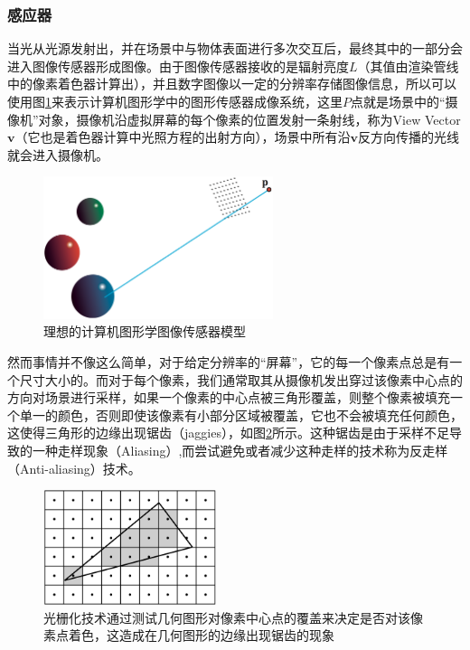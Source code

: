 \subsubsection{感应器}\label{sec:intro-sensor}
当光从光源发射出，并在场景中与物体表面进行多次交互后，最终其中的一部分会进入图像传感器形成图像。由于图像传感器接收的是辐射亮度$L$（其值由渲染管线中的像素着色器计算出），并且数字图像以一定的分辨率存储图像信息，所以可以使用图\ref{f:intro-camera}来表示计算机图形学中的图形传感器成像系统，这里$P$点就是场景中的“摄像机”对象，摄像机沿虚拟屏幕的每个像素的位置发射一条射线，称为View Vector $\mathbf{v}$（它也是着色器计算中光照方程的出射方向），场景中所有沿$\mathbf{v}$反方向传播的光线就会进入摄像机。

\begin{figure}
\sidecaption
	\includegraphics[width=0.6\textwidth]{figures/intro/camera}
	\caption{理想的计算机图形学图像传感器模型}
	\label{f:intro-camera}
\end{figure}

然而事情并不像这么简单，对于给定分辨率的“屏幕”，它的每一个像素点总是有一个尺寸大小的。而对于每个像素，我们通常取其从摄像机发出穿过该像素中心点的方向对场景进行采样，如果一个像素的中心点被三角形覆盖，则整个像素被填充一个单一的颜色，否则即使该像素有小部分区域被覆盖，它也不会被填充任何颜色，这使得三角形的边缘出现锯齿（jaggies），如图\ref{f:intro-aliasing-triangle}所示。这种锯齿是由于采样不足导致的一种走样现象（Aliasing）,而尝试避免或者减少这种走样的技术称为反走样（Anti-aliasing）技术。

\begin{figure}
\sidecaption
	\includegraphics[width=0.45\textwidth]{figures/intro/aliasing-triangle}
	\caption{光栅化技术通过测试几何图形对像素中心点的覆盖来决定是否对该像素点着色，这造成在几何图形的边缘出现锯齿的现象}
	\label{f:intro-aliasing-triangle}
\end{figure}

